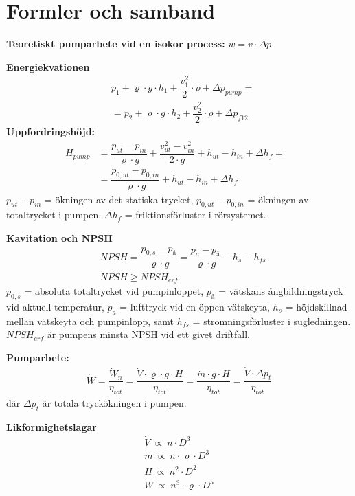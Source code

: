 \section*{Formler och samband}
	\textbf{Teoretiskt pumparbete vid en isokor process: } $w=v \cdot \Delta p$ \par
\textbf{Energiekvationen }  
	\begin{align*}
    & p_1 + \varrho \cdot g \cdot h_1 + \dfrac{v_1^2}{2} \cdot \rho +  \Delta p_{pump} = \\ 
    & = p_2 + \varrho \cdot g \cdot h_2 + \dfrac{v_2^2}{2} \cdot \rho +  \Delta p_{f12} 
	\end{align*}
\textbf{Uppfordringshöjd:} 
	\begin{align*}
    H_{pump} & = \dfrac{p_{ut}-p_{in}}{\varrho \cdot g}+\dfrac{v^2_{ut}-v^2_{in}}{2\cdot g}+h_{ut}-h_{in} + \Delta h_f = &\\
    & = \dfrac{p_{0,ut}-p_{0,in}}{\varrho \cdot g}+h_{ut}-h_{in} + \Delta h_f  
	\end{align*}
$p_{ut}-p_{in}$ = ökningen av det statiska trycket, $p_{0,ut}-p_{0,in}$ = ökningen av totaltrycket i pumpen. $\Delta h_f$ = friktionsförluster i rörsystemet. \par
\textbf{Kavitation och NPSH}
 \begin{align*}
	& \textit{NPSH} = \dfrac{p_{0,s} - p_\text{å}}{\varrho \cdot g} = \dfrac{p_a - p_\text{å}}{\varrho \cdot g} - h_s - h_{fs} \\
	&	\textit{NPSH} \geq \textit{NPSH}_{erf}
 \end{align*}
$p_{0,s}$ = absoluta totaltrycket vid pumpinloppet, $p_\text{å}$ = vätskans ångbildningstryck vid aktuell temperatur, $p_a$ = lufttryck vid en öppen vätskeyta, $h_s$ = höjdskillnad mellan vätskeyta och pumpinlopp, samt $h_{fs}$ = strömningsförluster i sugledningen. $\textit{NPSH}_{erf}$ är pumpens minsta NPSH vid ett givet driftfall.\par
	\textbf{Pumparbete: }
	\begin{align*}
    & \dot{W} = \dfrac{\dot{W}_n}{\eta_{tot}} = \dfrac{\dot{V}\cdot \varrho \cdot g \cdot{H}}{\eta_{tot}}= \dfrac{\dot{m}\cdot g \cdot H }{\eta_{tot}}=  
    \dfrac{\dot{V}\cdot\Delta p_t}{\eta_{tot}} & 
	\end{align*}
       där $ \Delta p_t $  är totala tryckökningen i pumpen. \par
	\textbf{Likformighetslagar } 
	\begin{align*} 
  & \dot{V} \: \propto \: n \cdot D^3 & \\ 
	& \dot{m} \: \propto \: n \cdot \varrho \cdot  D^3 \\ 
  & H \: \propto \: n^2 \cdot D^2  \\
  & \dot{W} \: \propto \: n^3 \cdot \varrho \cdot D^5  
	\end{align*}
